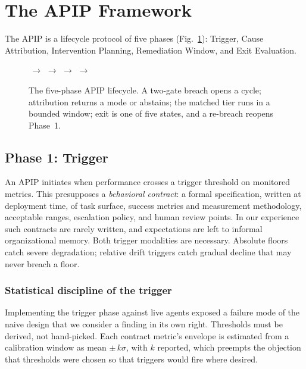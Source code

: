 \documentclass[conference]{IEEEtran}
\begin{document}
\section{The APIP Framework}
\label{sec:framework}

The APIP is a lifecycle protocol of five phases (Fig.~\ref{fig:lifecycle}):
Trigger, Cause Attribution, Intervention Planning, Remediation Window, and
Exit Evaluation.

\begin{figure}[t]
  \centering
  \scriptsize
  \setlength{\fboxsep}{2pt}
  \,$\rightarrow$\,\,$\rightarrow$\,\,$\rightarrow$\,\,$\rightarrow$\,
  \caption{The five-phase APIP lifecycle. A two-gate breach opens a cycle; attribution returns a mode or abstains; the matched tier runs in a bounded window; exit is one of five states, and a re-breach reopens Phase~1.}
  \label{fig:lifecycle}
\end{figure}

\subsection{Phase 1: Trigger}
\label{sec:trigger}

An APIP initiates when performance crosses a trigger threshold on monitored
metrics. This presupposes a \emph{behavioral contract}: a formal specification,
written at deployment time, of task surface, success metrics and measurement
methodology, acceptable ranges, escalation policy, and human review points. In
our experience such contracts are rarely written, and expectations are left to
informal organizational memory.
Both trigger modalities are necessary. Absolute floors catch severe
degradation; relative drift triggers catch gradual decline that may never
breach a floor.

\subsubsection{Statistical discipline of the trigger}
Implementing the trigger phase against live agents exposed a failure mode of
the naive design that we consider a finding in its own right. Thresholds must
be derived, not hand-picked. Each contract metric's envelope is estimated from
a calibration window as mean $\pm\,k\sigma$, with $k$ reported, which preempts
the objection that thresholds were chosen so that triggers would fire where
desired.
\end{document}
